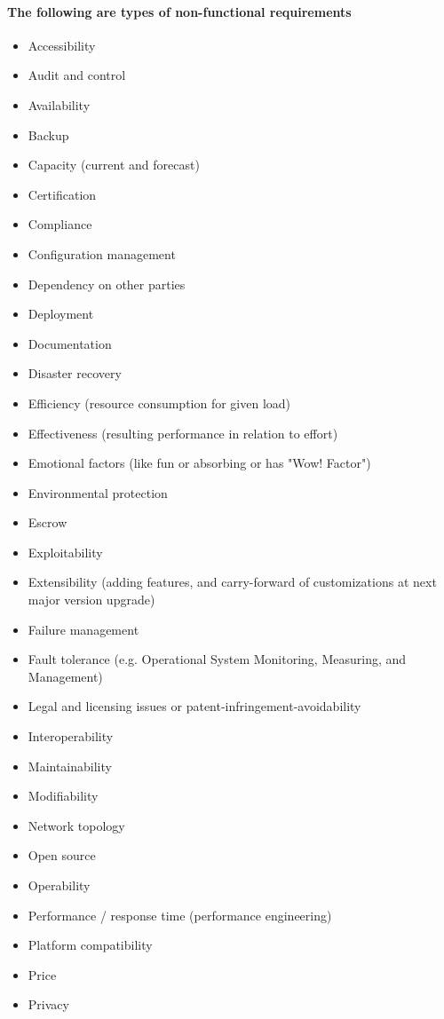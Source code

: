 \documentclass{acm_proc_article-sp}
\begin{document}
\paragraph{The following are types of non-functional requirements}
\begin{itemize} 
\item Accessibility
\item Audit and control
\item Availability
\item Backup
\item Capacity (current and forecast)
\item Certification
\item Compliance
\item Configuration management
\item Dependency on other parties
\item Deployment
\item Documentation
\item Disaster recovery
\item Efficiency (resource consumption for given load)
\item Effectiveness (resulting performance in relation to effort)
\item Emotional factors (like fun or absorbing or has "Wow! Factor")
\item Environmental protection
\item Escrow
\item Exploitability
\item Extensibility (adding features, and carry-forward of customizations at next major version upgrade)
\item Failure management
\item Fault tolerance (e.g. Operational System Monitoring, Measuring, and Management)
\item Legal and licensing issues or patent-infringement-avoidability
\item Interoperability
\item Maintainability
\item Modifiability
\item Network topology
\item Open source
\item Operability
\item Performance / response time (performance engineering)
\item Platform compatibility
\item Price
\item Privacy

\end{itemize}
\end{document}
